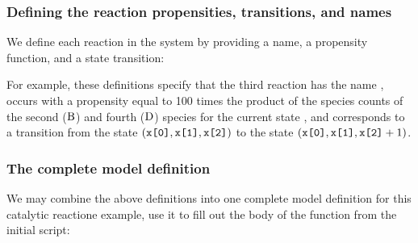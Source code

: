 \subsubsection{Defining the reaction propensities, transitions, and names}
We define each reaction in the system by providing a name, a propensity
function, and a state transition:

For example, these definitions specify that the third reaction has the name
, occurs with a propensity equal to 100 times the product of
the species counts of the second ($ \textrm{{B}} $) and fourth
($ \textrm{{D}} $) species for the current state , and corresponds
to a transition from the state $(\texttt{x[0]}, \texttt{x[1]}, \texttt{x[2]})$ to the
state $(\texttt{x[0]}, \texttt{x[1]}, \texttt{x[2]} + 1)$.

\subsubsection{The complete model definition}
We may combine the above definitions into one
complete model definition for this catalytic reactione example, use it to fill
out the body of the function  from the initial
script:
